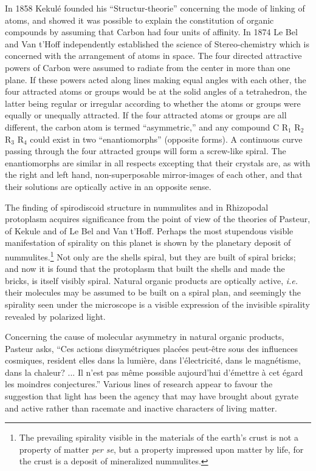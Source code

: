 \documentclass[a4paper, 12pt, oneside]{article}
\begin{document}
In 1858 Kekulé founded his ``Structur-theorie'' concerning the mode of linking of atoms, and showed it was possible to explain the constitution of organic compounds by assuming that Carbon had four units of affinity. In 1874 Le Bel and Van t'Hoff independently established the science of Stereo-chemistry which is concerned with the arrangement of atoms in space. The four directed attractive powers of Carbon were assumed to radiate from the center in more than one plane. If these powers acted along lines making equal angles with each other, the four attracted atoms or groups would be at the solid angles of a tetrahedron, the latter being regular or irregular according to whether the atoms or groups were equally or unequally attracted. If the four attracted atoms or groups are all different, the carbon atom is termed ``asymmetric,'' and any compound C R$_{1}$ R$_{2}$ R$_{3}$ R$_{4}$ could exist in two ``enantiomorphs'' (opposite forms). A continuous curve passing through the four attracted groups will form a screw-like spiral. The enantiomorphs are similar in all respects excepting that their crystals are, as with the right and left hand, non-superposable mirror-images of each other, and that their solutions are optically active in an opposite sense.

The finding of spirodiscoid structure in nummulites and in Rhizopodal protoplasm acquires significance from the point of view of the theories of Pasteur, of Kekule and of Le Bel and Van t'Hoff. Perhaps the most stupendous visible manifestation of spirality on this planet is shown by the planetary deposit of nummulites.\footnote{The prevailing spirality visible in the materials of the earth's crust is not a property of matter \emph{per se}, but a property impressed upon matter by life, for the crust is a deposit of mineralized nummulites.} Not only are the shells spiral, but they are built of spiral bricks; and now it is found that the protoplasm that built the shells and made the bricks, is itself visibly spiral. Natural organic products are optically active, \emph{i.e.} their molecules may be assumed to be built on a spiral plan, and seemingly the spirality seen under the microscope is a visible expression of the invisible spirality revealed by polarized light.

Concerning the cause of molecular asymmetry in natural organic products, Pasteur asks, ``Ces actions dissymétriques placées peut-être sous des influences cosmiques, resident elles dans la lumière, dans l'électricité, dans le magnétisme, dans la chaleur? ... Il n'est pas même possible aujourd'hui d'émettre à cet égard les moindres conjectures.'' Various lines of research appear to favour the suggestion that light has been the agency that may have brought about gyrate and active rather than racemate and inactive characters of living matter.
\end{document}
